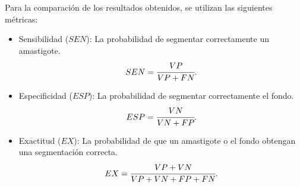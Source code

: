 Para la comparación de los resultados obtenidos, se utilizan las siguientes métricas:
\begin{itemize}
\item Sensibilidad ($SEN$): La probabilidad de segmentar correctamente un amastigote.
\begin{equation}\label{eq:sensibilidad}
  SEN = \cfrac{VP}{VP + FN}.
\end{equation}
\item Especificidad ($ESP$): La probabilidad de segmentar correctamente el fondo.
\begin{equation}\label{eq:especificidad}
  ESP = \cfrac{VN}{VN + FP}.
\end{equation}
\item Exactitud ($EX$): La probabilidad de que un amastigote o el fondo obtengan una segmentación correcta.
\begin{equation}\label{eq:exactitud}
  EX = \cfrac{VP + VN}{VP + VN + FP + FN}.
\end{equation}
\end{itemize}